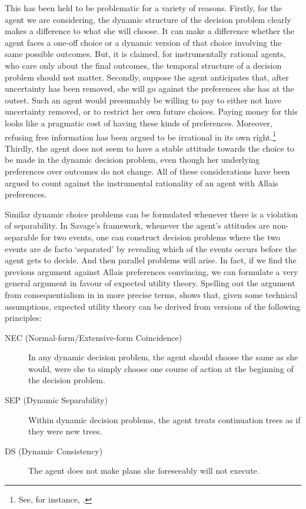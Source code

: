 This has been held to be problematic for a variety of reasons. Firstly, for the agent we are considering, the dynamic structure of the decision problem clearly makes a difference to what she will choose. It can make a difference whether the agent faces a one-off choice or a dynamic version of that choice involving the same possible outcomes. But, it is claimed, for instrumentally rational agents, who care only about the final outcomes, the temporal structure of a decision problem should not matter. Secondly, suppose the agent anticipates that, after uncertainty has been removed, she will go against the preferences she has at the outset. Such an agent would presumably be willing to pay to either not have uncertainty removed, or to restrict her own future choices. Paying money for this looks like a pragmatic cost of having these kinds of preferences. Moreover, refusing free information has been argued to be irrational in its own right.\footnote{See, for instance, \citet{Wakker1988}.} Thirdly, the agent does not seem to have a stable attitude towards the choice to be made in the dynamic decision problem, even though her underlying preferences over outcomes do not change. All of these considerations have been argued to count against the instrumental rationality of an agent with Allais preferences.

Similar dynamic choice problems can be formulated whenever there is a violation of separability. In Savage's framework, whenever the agent's attitudes are non-separable for two events, one can construct decision problems where the two events are de facto `separated' by revealing which of the events occurs before the agent gets to decide. And then parallel problems will arise. In fact, if we find the previous argument against Allais preferences convincing, we can formulate a very general argument in favour of expected utility theory. Spelling out the argument from consequentialism in \citet{Hammond1988} in more precise terms, \citet{McClennen1990} shows that, given some technical assumptions, expected utility theory can be derived from versions of the following principles:
\begin{description}
\item[NEC (Normal-form/Extensive-form Coincidence)] In any dyn\-amic decision problem, the agent should choose the same as she would, were she to simply choose one course of action at the beginning of the decision problem.
\item[SEP (Dynamic Separability)] Within dynamic decision problems, the agent treats continuation trees as if they were new trees.
\item[DS (Dynamic Consistency)] The agent does not make plans she foreseeably will not execute.
\end{description}

